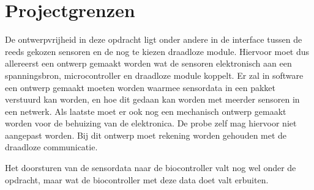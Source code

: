 \section{Projectgrenzen}
De ontwerpvrijheid in deze opdracht ligt onder andere in de interface tussen de reeds gekozen sensoren en de nog te kiezen draadloze module. Hiervoor moet dus allereerst een ontwerp gemaakt worden wat de sensoren elektronisch aan een spanningsbron, microcontroller en draadloze module koppelt. Er zal in software een ontwerp gemaakt moeten worden waarmee sensordata in een pakket verstuurd kan worden, en hoe dit gedaan kan worden met meerder sensoren in een netwerk. Als laatste moet er ook nog een mechanisch ontwerp gemaakt worden voor de behuizing van de elektronica. De probe zelf mag hiervoor niet aangepast worden. Bij dit ontwerp moet rekening worden gehouden met de draadloze communicatie. 

Het doorsturen van de sensordata naar de biocontroller valt nog wel onder de opdracht, maar wat de biocontroller met deze data doet valt erbuiten. 

 
